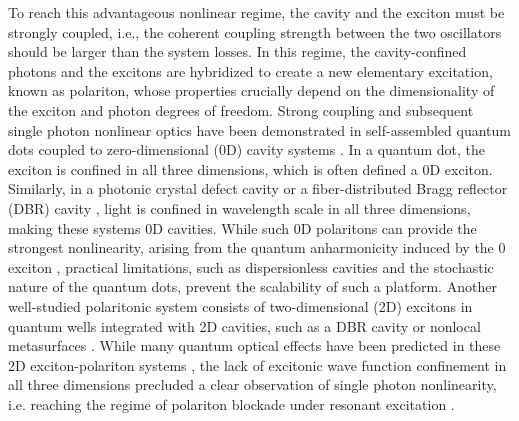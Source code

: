 \documentclass{achemso}
\begin{document}
To reach this advantageous nonlinear regime, the cavity and the exciton must be strongly coupled, i.e., the coherent coupling strength between the two oscillators should be larger than the system losses. In this regime, the cavity-confined photons and the excitons are hybridized to create a new elementary excitation, known as polariton, whose properties crucially depend on the dimensionality of the exciton and photon degrees of freedom. Strong coupling and subsequent single photon nonlinear optics have been demonstrated in self-assembled quantum dots coupled to zero-dimensional (0D) cavity systems \cite{faraon_coherent_2008, majumdar_probing_2012, reinhard_strongly_2012, najer_gated_2019}. In a quantum dot, the exciton is confined in all three dimensions, which is often defined a 0D exciton. Similarly, in a photonic crystal defect cavity \cite{Notomi_2010} or a fiber-distributed Bragg reflector (DBR) cavity \cite{Hunger_2010}, light is confined in wavelength scale in all three dimensions, making these systems 0D cavities. While such 0D polaritons can provide the strongest nonlinearity, arising from the quantum anharmonicity induced by the 0 exciton \cite{Hennessy_Nature_2007,najer_gated_2019}, practical limitations, such as dispersionless cavities and the stochastic nature of the quantum dots, prevent the scalability of such a platform. Another well-studied polaritonic system consists of two-dimensional (2D) excitons in quantum wells integrated with  2D cavities, such as a DBR cavity or nonlocal metasurfaces \cite{byrnes_excitonpolariton_2014, liu_strong_2015, chen_metasurface_2020}. While many quantum optical effects have been predicted in these 2D exciton-polariton systems \cite{Gerace_nphys_2009,Liew_coupled_modes_2010}, the lack of excitonic wave function confinement in all three dimensions precluded a clear observation of single photon nonlinearity, i.e. reaching the regime of polariton blockade under resonant excitation \cite{verger_polariton_2006}.
\end{document}
